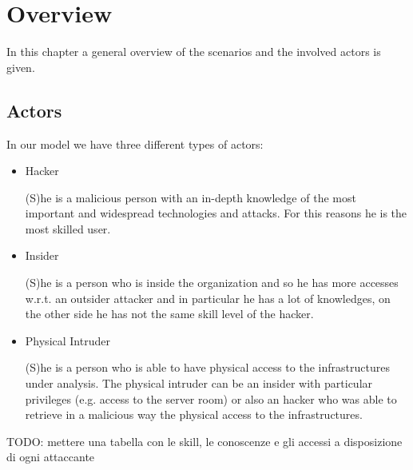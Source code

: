 %
\chapter{Overview}\label{ch:overview}

In this chapter a general overview of the scenarios and the involved actors is given.

\section{Actors} %
\noindent In our model we have three different types of actors:
\begin{itemize}
	\item Hacker
	
	\noindent (S)he is a malicious person with an in-depth knowledge of the most important and widespread technologies and attacks. For this reasons he is the most skilled user.
	
	\item Insider
	
	\noindent (S)he is a person who is inside the organization and so he has more accesses w.r.t. an outsider attacker and in particular he has a lot of knowledges, on the other side he has not the same skill level of the hacker.
	
	\item Physical Intruder
	
	\noindent (S)he is a person who is able to have physical access to the infrastructures under analysis. The physical intruder can be an insider with particular privileges (e.g. access to the server room) or also an hacker who was able to retrieve in a malicious way the physical access to the infrastructures.
\end{itemize}


\noindent TODO: mettere una tabella con le skill, le conoscenze e gli accessi a disposizione di ogni attaccante